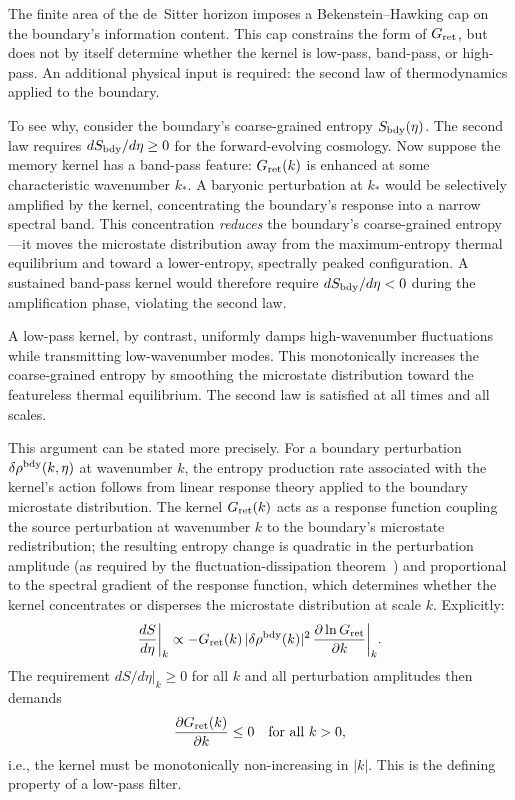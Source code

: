 \documentclass[aps,prd,twocolumn,superscriptaddress,nofootinbib]{revtex4-2}
\begin{document}
The finite area of the de~Sitter horizon imposes a Bekenstein--Hawking cap on the boundary's information content. This cap constrains the form of $G_{\rm ret}$, but does not by itself determine whether the kernel is low-pass, band-pass, or high-pass. An additional physical input is required: the second law of thermodynamics applied to the boundary.

To see why, consider the boundary's coarse-grained entropy $S_{\rm bdy}(\eta)$. The second law requires $dS_{\rm bdy}/d\eta \geq 0$ for the forward-evolving cosmology. Now suppose the memory kernel has a band-pass feature: $G_{\rm ret}(k)$ is enhanced at some characteristic wavenumber $k_*$. A baryonic perturbation at $k_*$ would be selectively amplified by the kernel, concentrating the boundary's response into a narrow spectral band. This concentration \emph{reduces} the boundary's coarse-grained entropy---it moves the microstate distribution away from the maximum-entropy thermal equilibrium and toward a lower-entropy, spectrally peaked configuration. A sustained band-pass kernel would therefore require $dS_{\rm bdy}/d\eta < 0$ during the amplification phase, violating the second law.

A low-pass kernel, by contrast, uniformly damps high-wavenumber fluctuations while transmitting low-wavenumber modes. This monotonically increases the coarse-grained entropy by smoothing the microstate distribution toward the featureless thermal equilibrium. The second law is satisfied at all times and all scales.

This argument can be stated more precisely. For a boundary perturbation $\delta\rho^{\rm bdy}(k, \eta)$ at wavenumber $k$, the entropy production rate associated with the kernel's action follows from linear response theory applied to the boundary microstate distribution. The kernel $G_{\rm ret}(k)$ acts as a response function coupling the source perturbation at wavenumber $k$ to the boundary's microstate redistribution; the resulting entropy change is quadratic in the perturbation amplitude (as required by the fluctuation-dissipation theorem~\cite{Kubo1966}) and proportional to the spectral gradient of the response function, which determines whether the kernel concentrates or disperses the microstate distribution at scale $k$. Explicitly:
\begin{equation}
\frac{dS}{d\eta}\bigg|_k \propto -G_{\rm ret}(k)\, |\delta\rho^{\rm bdy}(k)|^2 \, \frac{\partial \ln G_{\rm ret}}{\partial k}\bigg|_k.
\label{eq:entropy_production}
\end{equation}
The requirement $dS/d\eta|_k \geq 0$ for all $k$ and all perturbation amplitudes then demands
\begin{equation}
\frac{\partial G_{\rm ret}(k)}{\partial k} \leq 0 \quad \text{for all } k > 0,
\label{eq:lowpass_condition}
\end{equation}
i.e., the kernel must be monotonically non-increasing in $|k|$. This is the defining property of a low-pass filter.
\end{document}
